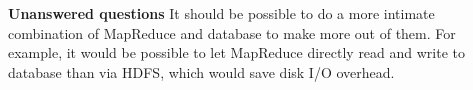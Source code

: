 \documentclass[12pt, a4paper]{llncs}
\begin{document}
\vspace{10pt}

\noindent
\textbf{Unanswered questions} It should be possible to do a more intimate 
combination of MapReduce and database to make more out of them. For example, it
would be possible to let MapReduce directly read and write to database than via 
HDFS, which would save disk I/O overhead.
\end{document}
